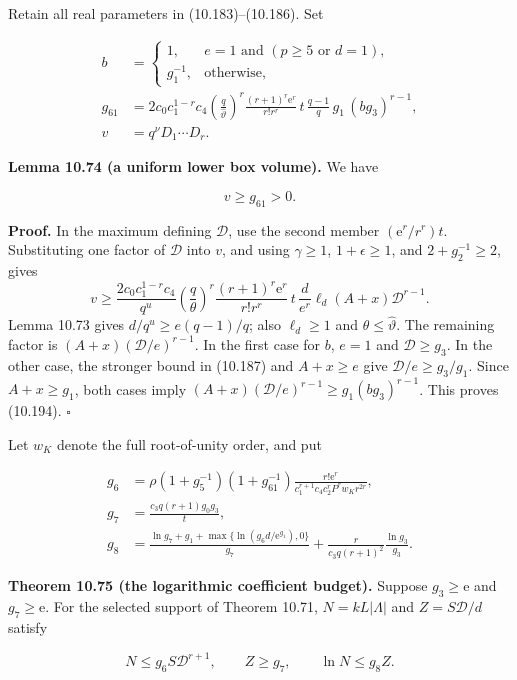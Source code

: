 \documentclass[
  11pt,
  a4paper,
]{article}
\begin{document}
Retain all real parameters in (10.183)--(10.186). Set

\[
\begin{aligned}
b&=\begin{cases}1,&e=1\text{ and }(p\ge5\text{ or }d=1),\\
g_1^{-1},&\text{otherwise},\end{cases}\\
g_{61}&=
2c_0c_1^{1-r}c_4
\left(\frac q{\widehat\vartheta}\right)^r
\frac{(r+1)^r\mathrm e^r}{r!r^r}\,
t\,\frac{q-1}{q}\,g_1\,(bg_3)^{r-1},\\
v&=q^\nu D_1\cdots D_r.
\end{aligned}
\tag{10.193}
\]

\textbf{Lemma 10.74 (a uniform lower box volume).} We have

\[
v\ge g_{61}>0.
\tag{10.194}
\]

\textbf{Proof.} In the maximum defining \(\mathcal D\), use the second
member \((\mathrm e^r/r^r)t\). Substituting one factor of \(\mathcal D\)
into \(v\), and using \(\gamma\ge1\), \(1+\epsilon\ge1\), and
\(2+g_2^{-1}\ge2\), gives \[
v\ge
\frac{2c_0c_1^{1-r}c_4}{q^u}
\left(\frac q\theta\right)^r
\frac{(r+1)^r\mathrm e^r}{r!r^r}\,
t\,\frac d{e^r}\ell_d(A+x)\mathcal D^{r-1}.
\] Lemma 10.73 gives \(d/q^u\ge e(q-1)/q\); also \(\ell_d\ge1\) and
\(\theta\le\widehat\vartheta\). The remaining factor is
\((A+x)(\mathcal D/e)^{r-1}\). In the first case for \(b\), \(e=1\) and
\(\mathcal D\ge g_3\). In the other case, the stronger bound in (10.187)
and \(A+x\ge e\) give \(\mathcal D/e\ge g_3/g_1\). Since \(A+x\ge g_1\),
both cases imply \((A+x)(\mathcal D/e)^{r-1}\ge g_1(bg_3)^{r-1}\). This
proves (10.194). \(\square\)

Let \(w_K\) denote the full root-of-unity order, and put

\[
\begin{aligned}
g_6&=
\rho(1+g_5^{-1})(1+g_{61}^{-1})
\frac{r!\mathrm e^r}
{c_1^{r+1}c_4c_2^rP^rw_Kr^{2r}},\\
g_7&=\frac{c_3q(r+1)g_0g_3}{t},\\
g_8&=\frac{\ln g_7+g_1+
\max\{\ln(g_6d/\mathrm e^{g_1}),0\}}{g_7}
+\frac r{c_3q(r+1)^2}\frac{\ln g_3}{g_3}.
\end{aligned}
\tag{10.195}
\]

\textbf{Theorem 10.75 (the logarithmic coefficient budget).} Suppose
\(g_3\ge\mathrm e\) and \(g_7\ge\mathrm e\). For the selected support of
Theorem 10.71, \(N=kL|\Lambda|\) and \(Z=S\mathcal D/d\) satisfy

\[
N\le g_6S\mathcal D^{r+1},
\qquad Z\ge g_7,\qquad
\ln N\le g_8Z.
\tag{10.196}
\]
\end{document}

